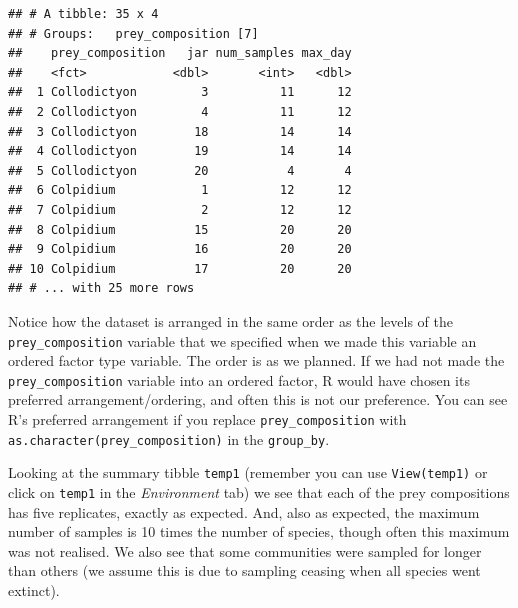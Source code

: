 \documentclass[]{book}
\newenvironment{Shaded}{\begin{snugshade}}{\end{snugshade}}
\newcommand{\DataTypeTok}[1]{\textcolor[rgb]{0.13,0.29,0.53}{#1}}
\newcommand{\KeywordTok}[1]{\textcolor[rgb]{0.13,0.29,0.53}{\textbf{#1}}}
\newcommand{\NormalTok}[1]{#1}
\newcommand{\OperatorTok}[1]{\textcolor[rgb]{0.81,0.36,0.00}{\textbf{#1}}}
\newcommand{\StringTok}[1]{\textcolor[rgb]{0.31,0.60,0.02}{#1}}
\begin{document}
\begin{Shaded}
\end{Shaded}

\begin{verbatim}
## # A tibble: 35 x 4
## # Groups:   prey_composition [7]
##    prey_composition   jar num_samples max_day
##    <fct>            <dbl>       <int>   <dbl>
##  1 Collodictyon         3          11      12
##  2 Collodictyon         4          11      12
##  3 Collodictyon        18          14      14
##  4 Collodictyon        19          14      14
##  5 Collodictyon        20           4       4
##  6 Colpidium            1          12      12
##  7 Colpidium            2          12      12
##  8 Colpidium           15          20      20
##  9 Colpidium           16          20      20
## 10 Colpidium           17          20      20
## # ... with 25 more rows
\end{verbatim}

\begin{info}
Notice how the dataset is arranged in the same order as the levels of
the \texttt{prey\_composition} variable that we specified when we made
this variable an ordered factor type variable. The order is as we
planned. If we had not made the \texttt{prey\_composition} variable into
an ordered factor, R would have chosen its preferred
arrangement/ordering, and often this is not our preference. You can see
R's preferred arrangement if you replace \texttt{prey\_composition} with
\texttt{as.character(prey\_composition)} in the \texttt{group\_by}.
\end{info}

Looking at the summary tibble \texttt{temp1} (remember you can use \texttt{View(temp1)} or click on \texttt{temp1} in the \emph{Environment} tab) we see that each of the prey compositions has five replicates, exactly as expected. And, also as expected, the maximum number of samples is 10 times the number of species, though often this maximum was not realised. We also see that some communities were sampled for longer than others (we assume this is due to sampling ceasing when all species went extinct).
\end{document}
